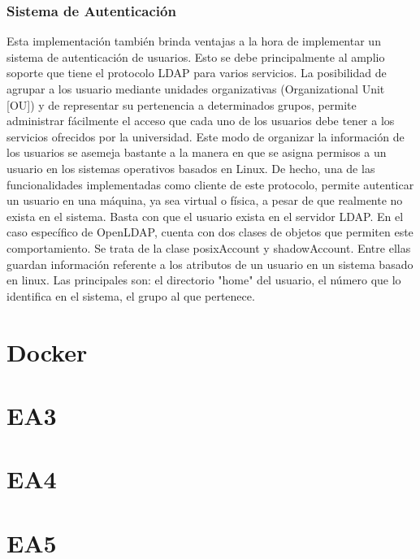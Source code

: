 \subsubsection{Sistema de Autenticación}
Esta implementación también brinda ventajas a la hora de implementar un sistema de 
autenticación de usuarios. Esto se debe principalmente al amplio soporte que tiene el protocolo 
LDAP para varios servicios. La posibilidad de agrupar a los usuario mediante unidades 
organizativas (Organizational Unit [OU]) y de representar su pertenencia a determinados 
grupos, permite administrar fácilmente el acceso que cada uno de los usuarios 
debe tener a los servicios ofrecidos por la universidad. Este modo de organizar la información 
de los usuarios se asemeja bastante a la manera en que se asigna permisos a un usuario en los 
sistemas operativos basados en Linux. De hecho, una de las funcionalidades implementadas 
como cliente de este protocolo, permite autenticar un usuario en una máquina, ya sea virtual o 
física, a pesar de que realmente no exista en el sistema. Basta con que el usuario exista en el 
servidor LDAP. En el caso específico de OpenLDAP, cuenta con dos clases de objetos que permiten
este comportamiento. Se trata de la clase posixAccount y shadowAccount. Entre ellas guardan 
información referente a los atributos de un usuario en un sistema basado en linux. Las principales
son: el directorio "home" del usuario, el número que lo identifica en el sistema, el grupo al que 
pertenece.


\section{Docker}
\section{EA3}
\section{EA4}
\section{EA5}
